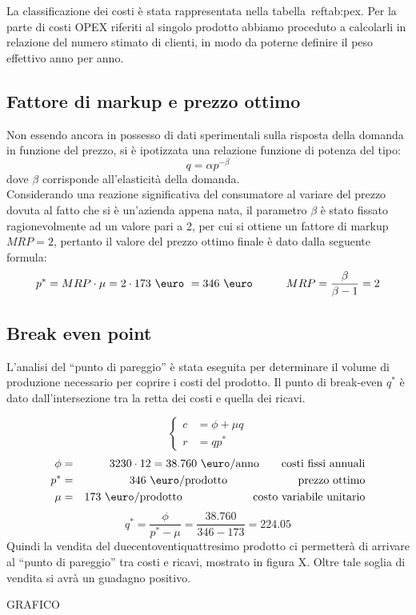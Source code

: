 La classificazione dei costi è stata rappresentata nella tabella~ref{tab:pex}.
Per la parte di costi OPEX riferiti al singolo prodotto abbiamo proceduto a
calcolarli in relazione del numero stimato di clienti, in modo da poterne
definire il peso effettivo anno per anno.





\subsection{Fattore di markup e prezzo ottimo}
Non essendo ancora in possesso di dati sperimentali sulla risposta della domanda
in funzione del prezzo, si è ipotizzata una relazione funzione di potenza del
tipo: 
\begin{displaymath}
q = \alpha p^{-\beta}
\end{displaymath}
dove $\beta$ corrisponde all’elasticità della domanda.\\
Considerando una reazione significativa del consumatore al variare del prezzo
dovuta al fatto che si è un’azienda appena nata, il parametro $\beta$ è stato
fissato ragionevolmente ad un valore pari a 2, per cui si ottiene un fattore di
markup $MRP=2$, pertanto il valore del prezzo ottimo finale è dato dalla
seguente formula:
\begin{displaymath}
	p^* = MRP \cdot \mu =  2 \cdot 173 \ \mbox{\euro} \ = 346 \ \mbox{\euro}
\qquad\quad    MRP = \frac{\beta}{\beta-1} = 2
\end{displaymath}
\subsection{Break even point}
L’analisi del “punto di pareggio” è stata eseguita per determinare il volume di
produzione necessario per coprire i costi del prodotto.  Il punto di break-even
$q^*$ è dato dall’intersezione tra la retta dei costi e quella dei ricavi. 

\setlength\arraycolsep{2pt}
\begin{displaymath}
\left\{ \begin{array}{rl}
c &= \phi + \mu q \\
r &= q p^* 
\end{array} \right .
\end{displaymath}
%
\begin{eqnarray*}
\phi &=& 3230 \cdot 12 = 38.760 \ \mbox{\euro/anno} \qquad \mbox{costi fissi
annuali} \\
p^* &=& 346 \ \mbox{\euro/prodotto} \ \qquad\quad\qquad\quad \mbox{prezzo ottimo} \\
\mu &=& 173 \ \mbox{\euro/prodotto} \ \qquad\quad\qquad\quad \mbox{costo variabile unitario}
\end{eqnarray*}
%
\begin{displaymath}
q^* = \frac{\phi}{p^* - \mu} = \frac{38.760}{346 - 173} = 224.05
\end{displaymath}
Quindi la vendita del duecentoventiquattresimo prodotto ci permetterà di
arrivare al “punto di pareggio” tra costi e ricavi, mostrato in figura X. Oltre
tale soglia di vendita si avrà un guadagno positivo.

GRAFICO

